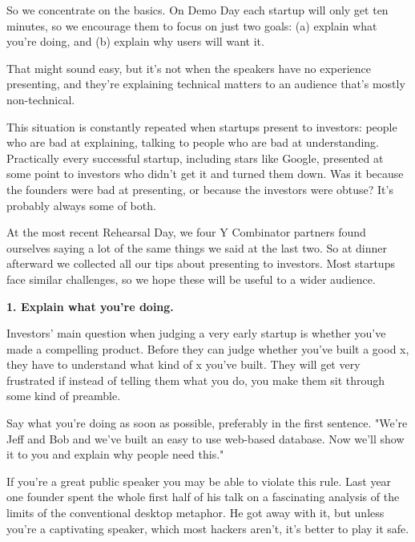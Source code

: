 So we concentrate on the basics. On Demo
                    Day each startup will only get ten minutes, so we encourage
                    them to focus on just two goals: (a) explain what you're
                    doing, and (b) explain why users will want it.

That
                    might sound easy, but it's not when the speakers have no
                    experience presenting, and they're explaining technical
                    matters to an audience that's mostly non-technical.

This
                    situation is constantly repeated when startups present to
                    investors: people who are bad at explaining, talking to
                    people who are bad at understanding. Practically every
                    successful startup, including stars like Google, presented
                    at some point to investors who didn't get it and turned them
                    down. Was it because the founders were bad at presenting, or
                    because the investors were obtuse? It's probably always some
                    of both.

At the most recent Rehearsal Day, we
                    four Y Combinator partners found ourselves saying a lot of
                    the same things we said at the last two. So at dinner
                    afterward we collected all our tips about presenting to
                    investors. Most startups face similar challenges, so we hope
                    these will be useful to a wider audience.


                    \textbf{1. Explain what you're doing.}

Investors'
                    main question when judging a very early startup is whether
                    you've made a compelling product. Before they can judge
                    whether you've built a good x, they have to understand what
                    kind of x you've built. They will get very frustrated if
                    instead of telling them what you do, you make them sit
                    through some kind of preamble.

Say what you're
                    doing as soon as possible, preferably in the first sentence.
                    "We're Jeff and Bob and we've built an easy to use web-based
                    database. Now we'll show it to you and explain why people
                    need this."

If you're a great public speaker you
                    may be able to violate this rule. Last year one founder
                    spent the whole first half of his talk on a fascinating
                    analysis of the limits of the conventional desktop metaphor.
                    He got away with it, but unless you're a captivating
                    speaker, which most hackers aren't, it's better to play it
                    safe.

